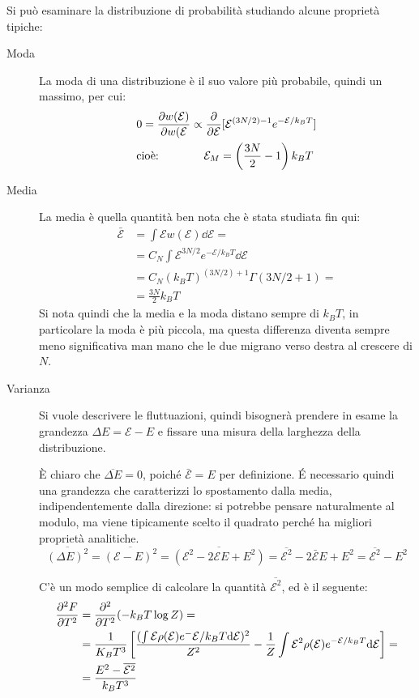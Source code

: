 Si può esaminare la distribuzione di probabilità studiando alcune proprietà tipiche:
\begin{description}
	\item[Moda] La moda di una distribuzione è il suo valore più probabile, quindi un massimo, per cui:
	\begin{align*}
	&0 = \frac{\partial {w(\mathcal{E})}}{\partial {w(\mathcal{E}}} \propto \frac{\partial {}}{\partial {\mathcal{E}}}[\mathcal{E}^{(3N/2)-1}e^{-\mathcal{E}/k_B T}]\\
	&\text{cioè:} \qquad \qquad \mathcal{E}_M = \left(\frac{3N}{2} - 1\right) k_B T
	\end{align*}
	
	\item[Media] La media è quella quantità ben nota che è stata studiata fin qui:
	\begin{align*}
	\bar{\mathcal{E}} &= \int \mathcal{E} w(\mathcal{E}) \dd \mathcal{E} =\\
	&= C_N \int \mathcal{E}^{3N/2}e^{-\mathcal{E}/k_B T} \dd \mathcal{E}\\
	&= C_N (k_B T)^{(3N/2) + 1} \Gamma(3N/2 +1) =\\
	&= \frac{3N}{2} k_B T
	\end{align*}
	Si nota quindi che la media e la moda distano sempre di $k_B T$, in particolare la moda è più piccola, ma questa differenza diventa sempre meno significativa man mano che le due migrano verso destra al crescere di $N$.
	
	\item[Varianza] Si vuole descrivere le fluttuazioni, quindi bisognerà prendere in esame la grandezza $\Delta E = \mathcal{E} - E$ e fissare una misura della larghezza della distribuzione.
	
	\`E chiaro che $\overline{\Delta E} = 0$, poiché $\bar{\mathcal{E}} = E$ per definizione. \'E necessario quindi una grandezza che caratterizzi lo spostamento dalla media, indipendentemente dalla direzione: si potrebbe pensare naturalmente al modulo, ma viene tipicamente scelto il quadrato perché ha migliori proprietà analitiche.
	\begin{equation*}
	\overline{(\Delta E)^2} = \overline{(\mathcal{E} - E)^2} = \overline{(\mathcal{E}^2 - 2\mathcal{E}E + E^2)} = \overline{\mathcal{E}^2} - 2\bar{\mathcal{E}}E + E^2 = \overline{\mathcal{E}^2} - E^2
	\end{equation*}
	
	C'è un modo semplice di calcolare la quantità $\overline{\mathcal{E}^2}$, ed è il seguente:
	\begin{align*}
	\frac{\partial {^2 F}}{\partial {T^2}} &= \frac{\partial {^2}}{\partial {T^2}} (-k_B T \log Z) =\\
	&= \frac{1}{K_B T^3}\left[\frac{(\int\mathcal{E} \rho(\mathcal{E})e^-{\mathcal{E}/k_B T} \dd \mathcal{E})^2}{Z^2}-\frac{1}{Z} \int \mathcal{E}^2\rho(\mathcal{E})e^{-\mathcal{E}/k_B T}\dd \mathcal{E}\right] =\\
	&= \frac{E^2 - \overline{\mathcal{E}^2}}{k_B T^3}
	\end{align*}
	

\end{description}
